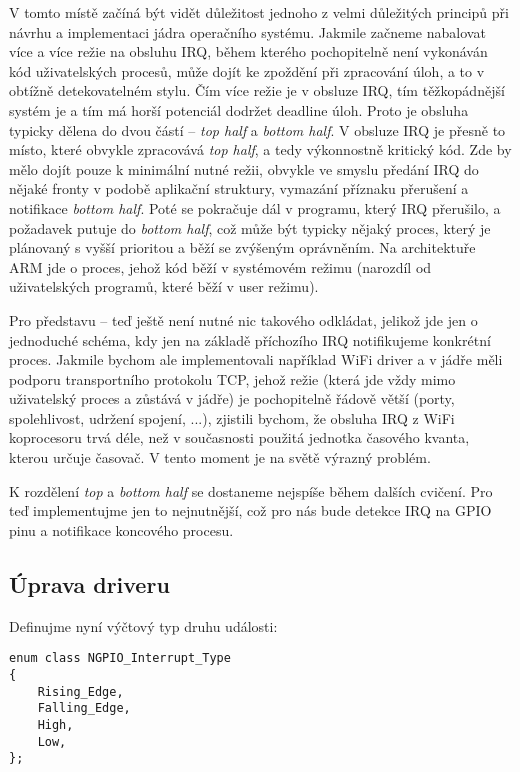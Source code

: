 \documentclass{article}
\begin{document}
\begin{mdframed}[style=MyFrame]
V tomto místě začíná být vidět důležitost jednoho z velmi důležitých principů při návrhu a implementaci jádra operačního systému. Jakmile začneme nabalovat více a více režie na obsluhu IRQ, během kterého pochopitelně není vykonáván kód uživatelských procesů, může dojít ke zpoždění při zpracování úloh, a to v obtížně detekovatelném stylu. Čím více režie je v obsluze IRQ, tím těžkopádnější systém je a tím má horší potenciál dodržet deadline úloh. Proto je obsluha typicky dělena do dvou částí -- \emph{top half} a \emph{bottom half}. V obsluze IRQ je přesně to místo, které obvykle zpracovává \emph{top half}, a tedy výkonnostně kritický kód. Zde by mělo dojít pouze k minimální nutné režii, obvykle ve smyslu předání IRQ do nějaké fronty v podobě aplikační struktury, vymazání příznaku přerušení a notifikace \emph{bottom half}. Poté se pokračuje dál v programu, který IRQ přerušilo, a požadavek putuje do \emph{bottom half}, což může být typicky nějaký proces, který je plánovaný s vyšší prioritou a běží se zvýšeným oprávněním. Na architektuře ARM jde o proces, jehož kód běží v systémovém režimu (narozdíl od uživatelských programů, které běží v user režimu).

Pro představu -- teď ještě není nutné nic takového odkládat, jelikož jde jen o jednoduché  schéma, kdy jen na základě příchozího IRQ notifikujeme konkrétní proces. Jakmile bychom ale implementovali například WiFi driver a v jádře měli podporu transportního protokolu TCP, jehož režie (která jde vždy mimo uživatelský proces a zůstává v jádře) je pochopitelně řádově větší (porty, spolehlivost, udržení spojení, ...), zjistili bychom, že obsluha IRQ z WiFi koprocesoru trvá déle, než v současnosti použitá jednotka časového kvanta, kterou určuje časovač. V tento moment je na světě výrazný problém.
\end{mdframed}

K rozdělení \emph{top} a \emph{bottom half} se dostaneme nejspíše během dalších cvičení. Pro teď implementujme jen to nejnutnější, což pro nás bude detekce IRQ na GPIO pinu a notifikace koncového procesu.

\subsection{Úprava driveru}

Definujme nyní výčtový typ druhu události:
\begin{lstlisting}
enum class NGPIO_Interrupt_Type
{
	Rising_Edge,
	Falling_Edge,
	High,
	Low,
};
\end{lstlisting}
\end{document}
